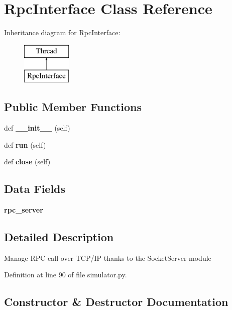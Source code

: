 \section{Rpc\+Interface Class Reference}
\label{classmodbus__tk_1_1simulator_1_1_rpc_interface}
Inheritance diagram for Rpc\+Interface\+:\begin{figure}[H]
\begin{center}
\leavevmode
\includegraphics[height=2.000000cm]{classmodbus__tk_1_1simulator_1_1_rpc_interface}
\end{center}
\end{figure}
\subsection*{Public Member Functions}
\begin{DoxyCompactItemize}
\item 
def {\bf \+\_\+\+\_\+init\+\_\+\+\_\+} (self)
\item 
def {\bf run} (self)
\item 
def {\bf close} (self)
\end{DoxyCompactItemize}
\subsection*{Data Fields}
\begin{DoxyCompactItemize}
\item 
{\bf rpc\+\_\+server}
\end{DoxyCompactItemize}


\subsection{Detailed Description}
\begin{DoxyVerb}Manage RPC call over TCP/IP thanks to the SocketServer module\end{DoxyVerb}
 

Definition at line 90 of file simulator.\+py.



\subsection{Constructor \& Destructor Documentation}

